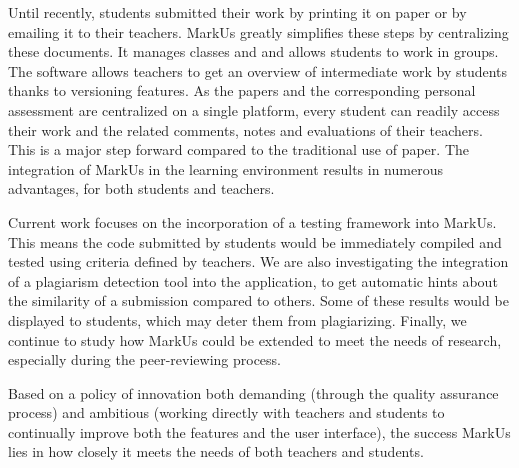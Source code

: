 \documentclass[twocolumn,10pt]{asme2e}
\begin{document}
Until recently, students submitted their work by printing it on paper or by emailing it to their teachers. MarkUs greatly simplifies these steps by centralizing these documents. It manages classes and and allows students to work in groups. The software allows teachers to get an overview of intermediate work   by students thanks to versioning features. As the papers and the corresponding personal assessment are centralized on a single platform, every student can readily access their work and the related comments, notes and evaluations of their teachers. This is a major step forward compared to the traditional use of paper. The integration of MarkUs in the learning environment results in numerous advantages, for both students and teachers.

Current work focuses on the incorporation of a testing framework into MarkUs. This means the code submitted by students would be immediately compiled and tested using criteria defined by teachers. We are also investigating the integration of a plagiarism detection tool into the application, to get automatic hints about the similarity of a submission compared to others. Some of these results would be displayed to students, which may deter them from plagiarizing. Finally, we continue to study how MarkUs could be extended to meet the needs of research, especially during the peer-reviewing process. 

Based on a policy of innovation both demanding (through the quality assurance process) and ambitious (working directly with teachers and students to continually improve both the features and the user interface), the success MarkUs lies in how closely it meets the needs of both teachers and students.


\end{document}
